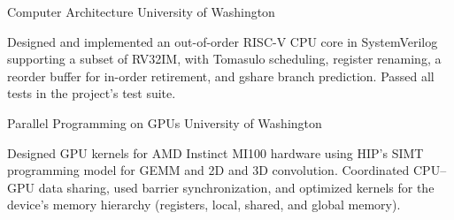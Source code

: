 
\begin{cventries}
  \cventry
    {Computer Architecture}
    {University of Washington}
    {}
    {}
    {
      \begin{cvitems}
        \item {Designed and implemented an out-of-order RISC-V CPU core in SystemVerilog supporting a subset of RV32IM, with Tomasulo scheduling, register renaming, a reorder buffer for in-order retirement, and gshare branch prediction. Passed all tests in the project's test suite.}
      \end{cvitems}
    }

  \cventry
    {Parallel Programming on GPUs}
    {University of Washington}
    {}
    {}
    {
      \begin{cvitems}
        \item {Designed GPU kernels for AMD Instinct MI100 hardware using HIP's SIMT programming model for GEMM and 2D and 3D convolution. Coordinated CPU--GPU data sharing, used barrier synchronization, and optimized kernels for the device's memory hierarchy (registers, local, shared, and global memory).}
      \end{cvitems}
    }
\end{cventries}

